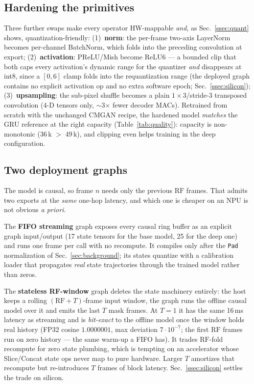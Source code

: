 \documentclass{article}
\begin{document}
\subsection{Hardening the primitives}
\label{ssec:hardening}

Three further swaps make every operator HW-mappable \emph{and}, as
Sec.~\ref{ssec:quant} shows, quantization-friendly:
(1)~\textbf{norm}: the per-frame two-axis LayerNorm becomes per-channel
BatchNorm, which folds into the preceding convolution at export;
(2)~\textbf{activation}: PReLU/Mish become ReLU6 --- a bounded clip that both
caps every activation's dynamic range for the quantizer \emph{and} disappears
at int8, since a $[0,6]$ clamp folds into the requantization range (the
deployed graph contains no explicit activation op and no extra software epoch;
Sec.~\ref{ssec:silicon});
(3)~\textbf{upsampling}: the sub-pixel shuffle becomes a plain
$1\times3$/stride-3 transposed convolution (4-D tensors only, $\sim$3$\times$
fewer decoder MACs). Retrained from scratch with the unchanged CMGAN recipe,
the hardened model \emph{matches} the GRU reference at the right capacity
(Table~\ref{tab:quality}): capacity is non-monotonic (36\,k $>$ 49\,k), and
clipping even helps training in the deep configuration.

\subsection{Two deployment graphs}
\label{ssec:deploy}

The model is causal, so frame $n$ needs only the previous $\mathrm{RF}$
frames. That admits two exports at the \emph{same} one-hop latency, and which
one is cheaper on an NPU is not obvious \emph{a priori}.

The \textbf{FIFO streaming} graph exposes every causal ring buffer as an
explicit graph input/output (17 state tensors for the base model, 25 for the
deep one) and runs one frame per call with no recompute. It compiles only
after the \texttt{Pad} normalization of Sec.~\ref{sec:background}; its states
quantize with a calibration loader that propagates \emph{real} state
trajectories through the trained model rather than zeros.

The \textbf{stateless RF-window} graph deletes the state machinery entirely:
the host keeps a rolling $(\mathrm{RF}{+}T)$-frame input window, the graph
runs the offline causal model over it and emits the last $T$ mask frames. At
$T{=}1$ it has the same 16\,ms latency as streaming and is \emph{bit-exact} to
the offline model once the window holds real history (FP32 cosine
$1.0000001$, max deviation $7\cdot10^{-7}$; the first $\mathrm{RF}$ frames run
on zero history --- the same warm-up a FIFO has). It trades
$\mathrm{RF}$-fold recompute for zero state plumbing, which is tempting on an
accelerator whose Slice/Concat state ops never map to pure hardware. Larger
$T$ amortizes that recompute but re-introduces $T$ frames of block latency.
Sec.~\ref{ssec:silicon} settles the trade on silicon.
\end{document}
